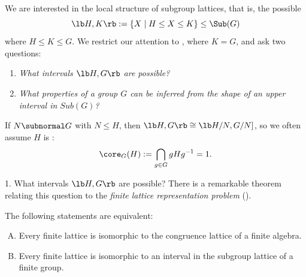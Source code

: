 \begin{frame}[fragile,label=LocalStructure]{}
We are interested in the local structure of subgroup lattices, that is,
the possible 
\[
\lb H, K \rb := \{X \mid H \leq X \leq K\} \leq \Sub(G)
\]
where $H \leq K \leq G$. 
\vskip4mm
We restrict our attention to , where $K = G$, and ask two
questions:
\vskip4mm
\begin{enumerate}
\item \emph{What intervals $\lb H,G \rb$ are possible?}
\vskip4mm
\item \emph{What properties of a group $G$ can be inferred from the shape of an
  upper interval in $Sub(G)$?}
\end{enumerate}
\end{frame}

\begin{frame}[fragile,label=LocalStructureCoreFree]{}
If $N \subnormal G$
with $N \leq H$, then  $\lb H, G \rb\cong \lb H/N, G/N]$, 
\vskip2mm
so we often assume $H$ is :
\[
\core_G(H) := \bigcap_{g\in G} gHg^{-1} = 1.
\]
\end{frame}

\begin{frame}[fragile,label=LocalStructureNote]{}
\end{frame}

\begin{frame}[fragile,label=LocalStructure]{1. What intervals $\lb H,G \rb$ are possible?}
There is a remarkable theorem relating this question to the \emph{finite lattice representation problem} (\FLRP).
\vskip5mm
\begin{theorem}
\label{thm:P5}
The following statements are equivalent:
\begin{enumerate}[(A)]
\item Every finite lattice is isomorphic to
  the congruence lattice of a finite algebra.
\item Every finite lattice is isomorphic to
  an interval in the subgroup lattice of a finite group.
\end{enumerate}
\end{theorem}
\end{frame}

